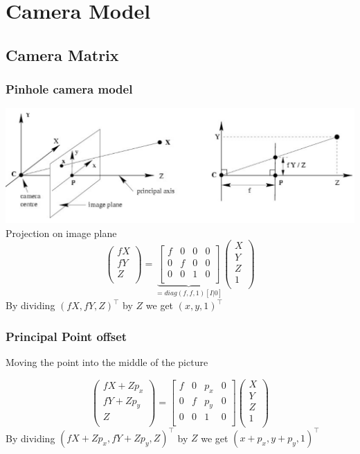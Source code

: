 \section{Camera Model}
\subsection{Camera Matrix}
\subsubsection{Pinhole camera model}
\includegraphics[width=\columnwidth]{pictures/pinholecamera}
Projection on image plane
$$\begin{pmatrix}
fX\\
fY\\
Z\\
\end{pmatrix} = 
\underbrace{\begin{bmatrix}
	f&0&0&0\\
	0&f&0&0\\
	0&0&1&0\\
	\end{bmatrix} }_{= diag(f,f,1)[I|0]} \begin{pmatrix}
X\\
Y\\
Z\\
1\\
\end{pmatrix} $$
By dividing $(fX,fY,Z)^\top$ by $Z$ we get $(x,y,1)^\top$

\subsubsection{Principal Point offset}
Moving the point into the middle of the picture

$$\begin{pmatrix}
fX+Zp_x\\
fY+Zp_y\\
Z\\
\end{pmatrix} = \begin{bmatrix}
f&0&p_x&0\\
0&f&p_y&0\\
0&0&1&0\\
\end{bmatrix} \begin{pmatrix}
X\\
Y\\
Z\\
1\\
\end{pmatrix} $$
By dividing $(fX+Zp_x,fY+Zp_y,Z)^\top$ by $Z$ we get $(x+p_x,y+p_y,1)^\top$

